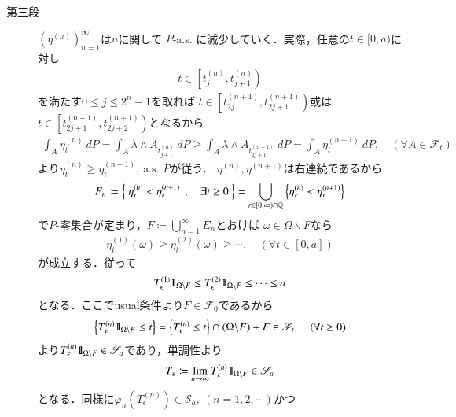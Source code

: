 \begin{prf}
\begin{description}
			\item[第三段]
				$\left( \eta^{(n)} \right)_{n=1}^\infty$は$n$に関して
				$P$-a.s. に減少していく．実際，任意の$t \in [0,a)$に対し
				\begin{align}
					t \in \left[t^{(n)}_j, t^{(n)}_{j+1}\right)
				\end{align}
				を満たす$0 \leq j \leq 2^n-1$を取れば
				$t \in \left[t^{(n+1)}_{2j}, t^{(n+1)}_{2j+1}\right)$或は
				$t \in \left[t^{(n+1)}_{2j+1}, t^{(n+1)}_{2j+2}\right)$となるから
				\begin{align}
					\int_A \eta^{(n)}_t\ dP
					= \int_A \lambda \wedge A_{t^{(n)}_{j+1}}\ dP
					\geq \int_A \lambda \wedge A_{t^{(n+1)}_{2j+1}}\ dP
					= \int_A \eta^{(n+1)}_t\ dP,
					\quad (\forall A \in \mathscr{F}_t)
				\end{align}
				より$\eta^{(n)}_t \geq \eta^{(n+1)}_t,\ \mbox{a.s. $P$}$が従う．
				$\eta^{(n)},\eta^{(n+1)}$は右連続であるから
				\begin{align}
					F_n \coloneqq \left\{\ \eta^{(n)}_t < \eta^{(n+1)}_t\ \, ; \quad \exists t \geq 0\ \right\}
					= \bigcup_{r \in [0,\infty) \cap \mathbb{Q}} \left\{\eta^{(n)}_r < \eta^{(n+1)}_r\right\}
				\end{align}
				で$P$-零集合が定まり，$F \coloneqq \bigcup_{n=1}^\infty E_n$とおけば
				$\omega \in \Omega \backslash F$なら
				\begin{align}
					\eta^{(1)}_t(\omega) \geq \eta^{(2)}_t(\omega) \geq \cdots,
					\quad (\forall t \in [0,a])
				\end{align}
				が成立する．従って
				\begin{align}
					T^{(1)}_\epsilon \mbox{1}\hspace{-0.25em}\mbox{l}_{\Omega \backslash F} 
					\leq T^{(2)}_\epsilon \mbox{1}\hspace{-0.25em}\mbox{l}_{\Omega \backslash F} \leq \cdots \leq a
				\end{align}
				となる．ここでusual条件より$F \in \mathscr{F}_0$であるから
				\begin{align}
					\left\{ T^{(n)}_\epsilon \mbox{1}\hspace{-0.25em}\mbox{l}_{\Omega \backslash F} \leq t \right\}
					= \left\{ T^{(n)}_\epsilon \leq t \right\} \cap (\Omega \backslash F) + F
					\in \mathscr{F}_t,\quad (\forall t \geq 0)
				\end{align}
				より$T^{(n)}_\epsilon \mbox{1}\hspace{-0.25em}\mbox{l}_{\Omega \backslash F} \in \mathscr{S}_a$であり，単調性より
				\begin{align}
					T_\epsilon \coloneqq \lim_{n \to \infty} T^{(n)}_\epsilon \mbox{1}\hspace{-0.25em}\mbox{l}_{\Omega \backslash F}
					\in \mathscr{S}_a
				\end{align}
				となる．同様に$\varphi_n\left(T^{(n)}_\epsilon\right) \in \mathscr{S}_a,\ (n=1,2,\cdots)$かつ

\end{description}
\end{prf}
